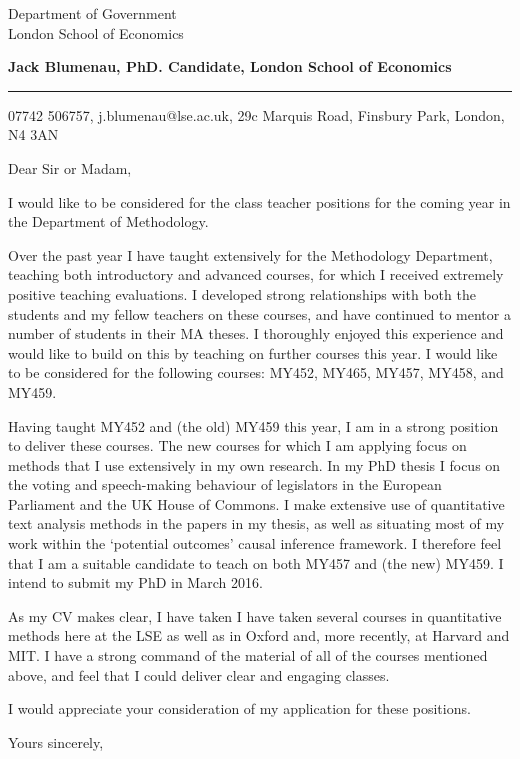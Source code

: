 \documentclass{letter} %
\begin{document}
\signature{Jack Blumenau}           %
\longindentation=0pt                       %
\let\raggedleft\raggedright                %
 
 
\begin{letter}{Department of Government \\
London School of Economics}


\begin{flushleft}
{\large\bf Jack Blumenau, PhD. Candidate, London School of Economics}
\end{flushleft}
\medskip\hrule height 1pt
\begin{flushright}
\hfill 07742 506757, j.blumenau@lse.ac.uk, 29c Marquis Road, Finsbury Park, London, N4 3AN 
\end{flushright} 

 \vfill
\opening{Dear Sir or Madam,} 
 
\noindent I would like to be considered for the class teacher positions for the coming year in the Department of Methodology. 
 
\noindent Over the past year I have taught extensively for the Methodology Department, teaching both introductory and advanced courses, for which I received extremely positive teaching evaluations. I developed strong relationships with both the students and my fellow teachers on these courses, and have continued to mentor a number of students in their MA theses. I thoroughly enjoyed this experience and would like to build on this by teaching on further courses this year. I would like to be considered for the following courses: MY452, MY465, MY457, MY458, and MY459.

\noindent Having taught MY452 and (the old) MY459 this year, I am in a strong position to deliver these courses. The new courses for which I am applying focus on methods that I use extensively in my own research.  In my PhD thesis I focus on the voting and speech-making behaviour of legislators in the European Parliament and the UK House of Commons. I make extensive use of quantitative text analysis methods in the papers in my thesis, as well as situating most of my work within the `potential outcomes' causal inference framework. I therefore feel that I am a suitable candidate to teach on both MY457 and (the new) MY459. I intend to submit my PhD in March 2016.

\noindent As my CV makes clear, I have taken I have taken several courses in quantitative methods here at the LSE as well as in Oxford and, more recently, at Harvard and MIT. I have a strong command of the material of all of the courses mentioned above, and feel that I could deliver clear and engaging classes. 
 
\noindent I would appreciate your consideration of my application for these positions.
 
\closing{Yours sincerely,} 
 

 


\end{letter}
 
\end{document}
